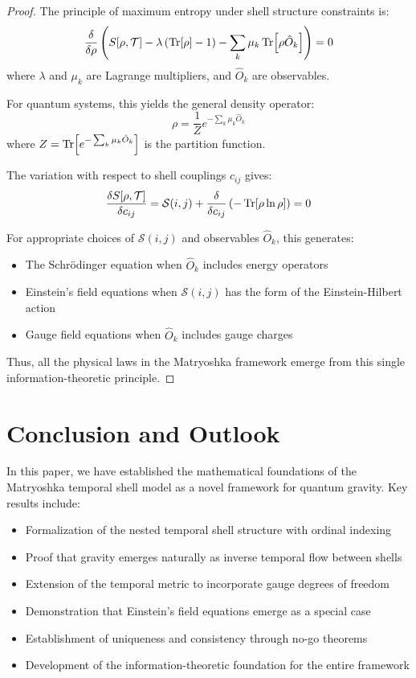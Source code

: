 \documentclass[12pt,a4paper]{article}
\begin{document}
\begin{proof}
The principle of maximum entropy under shell structure constraints is:
\begin{equation}
\frac{\delta}{\delta \rho}\left(S[\rho, \mathcal{T}] - \lambda \left(\Tr[\rho] - 1\right) - \sum_k \mu_k \Tr[\rho \hat{O}_k]\right) = 0
\end{equation}
where $\lambda$ and $\mu_k$ are Lagrange multipliers, and $\hat{O}_k$ are observables.

For quantum systems, this yields the general density operator:
\begin{equation}
\rho = \frac{1}{Z} e^{-\sum_k \mu_k \hat{O}_k}
\end{equation}
where $Z = \Tr[e^{-\sum_k \mu_k \hat{O}_k}]$ is the partition function.

The variation with respect to shell couplings $c_{ij}$ gives:
\begin{equation}
\frac{\delta S[\rho, \mathcal{T}]}{\delta c_{ij}} = \mathcal{S}(i,j) + \frac{\delta}{\delta c_{ij}} \left(-\Tr[\rho \ln \rho]\right) = 0
\end{equation}

For appropriate choices of $\mathcal{S}(i,j)$ and observables $\hat{O}_k$, this generates:
\begin{itemize}
    \item The Schrödinger equation when $\hat{O}_k$ includes energy operators
    \item Einstein's field equations when $\mathcal{S}(i,j)$ has the form of the Einstein-Hilbert action
    \item Gauge field equations when $\hat{O}_k$ includes gauge charges
\end{itemize}

Thus, all the physical laws in the Matryoshka framework emerge from this single information-theoretic principle.
\end{proof}

\section{Conclusion and Outlook}
\label{sec:conclusion}

In this paper, we have established the mathematical foundations of the Matryoshka temporal shell model as a novel framework for quantum gravity. Key results include:

\begin{itemize}
    \item Formalization of the nested temporal shell structure with ordinal indexing
    \item Proof that gravity emerges naturally as inverse temporal flow between shells
    \item Extension of the temporal metric to incorporate gauge degrees of freedom
    \item Demonstration that Einstein's field equations emerge as a special case
    \item Establishment of uniqueness and consistency through no-go theorems
    \item Development of the information-theoretic foundation for the entire framework
\end{itemize}
\end{document}
